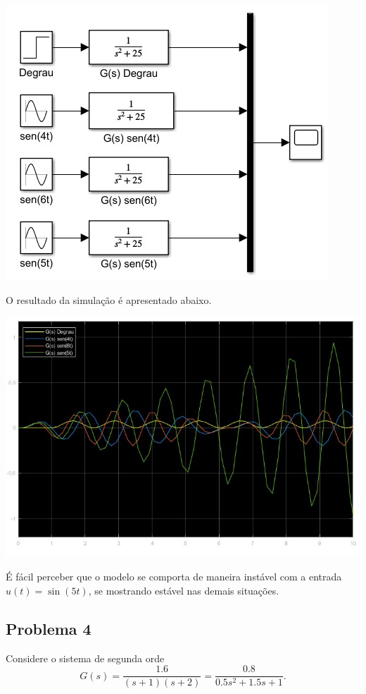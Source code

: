 \documentclass[
]{book}
\begin{document}
\includegraphics{Imagens/Lab2/modelSim3.jpg}

O resultado da simulação é apresentado abaixo.

\includegraphics{Imagens/Lab2/prob3Sim.jpg}

É fácil perceber que o modelo se comporta de maneira instável com a entrada \(u(t) = \sin(5t)\), se mostrando estável nas demais situações.

\hypertarget{problema-4}{%
\subsection*{Problema 4}\label{problema-4}}

Considere o sistema de segunda orde
\[
G(s) = \frac {1.6}{(s+1)(s+2)} = \frac {0.8}{0.5s^2+1.5s+1}.
\]
\end{document}
